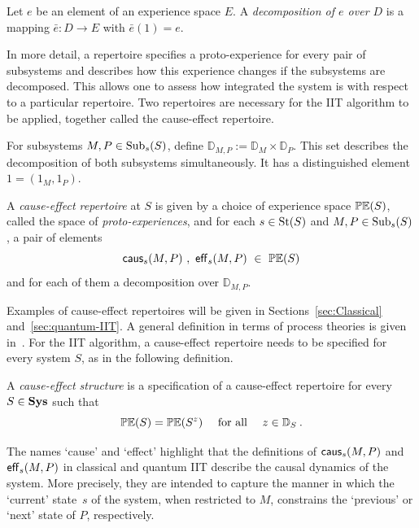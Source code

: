 \begin{definition}\label{def:Decomp}
Let $e$ be an element of an experience space $E$. A \emph{decomposition of $e$ over $D$} is a mapping $\bar{e} \colon D \to E$ with $\bar{e}(1) = e$.
\end{definition}

In more detail, a repertoire specifies a proto-experience for every pair of subsystems and describes how this experience changes if the subsystems are decomposed.
This allows one to assess how integrated the system is with respect to a particular repertoire. Two repertoires are necessary for the IIT algorithm to be applied, together called the cause-effect repertoire.

For subsystems $M,P \in \mathrm{Sub}_s(S)$, define $\mathbb D_{M,P} := \mathbb D_M \times \mathbb D_P$. This set describes the decomposition of both subsystems simultaneously. It has a distinguished element $1 = (1_M, 1_P)$.

\begin{definition} \label{def:repertoire}
A \emph{cause-effect repertoire} at $S$ is given by a choice of experience space $\mathbb{PE}(S)$, called the space of \emph{proto-experiences}, and for each 
$s \in \text{St}(S)$ and $M, P \in \mathrm{Sub}_s(S)$, a pair of elements 
\begin{equation}\label{eq:CauseEffectRep}
\mathsf{caus}_s(M,P) \  ,\  \mathsf{eff}_s(M,P) \  \in \ \mathbb{PE}(S)
\end{equation}
and for each of them a decomposition over $\mathbb D_{M,P}$.
\end{definition}

Examples of cause-effect repertoires will be given in Sections~\ref{sec:Classical} and~\ref{sec:quantum-IIT}. A general definition in terms of process theories is given in~\cite{IITProcess}. For the IIT algorithm, a cause-effect repertoire needs to be specified for every system $S$, as in the following definition.

\begin{definition}\label{def:cestructure}
A \emph{cause-effect structure} is a specification of a cause-effect repertoire for every $S \in \mathbf{Sys}$ such that
\begin{equation}\label{eq:cestructure}
\mathbb{PE}(S) = \mathbb{PE}({S}^{z}) \quad \textrm{ for all } \quad z \in \mathbb D_S \:.
\end{equation}
\end{definition}

The names `cause' and `effect' highlight that the definitions of $\mathsf{caus}_s(M,P)$ and  $\mathsf{eff}_s(M,P)$ in classical and quantum IIT describe the causal dynamics of the system. More precisely, they are intended to capture the manner in which the `current' state~$s$ of the system, when restricted to $M$, constrains the `previous' or `next' state of $P$, respectively. 



